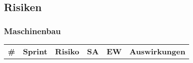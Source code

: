 \documentclass[main.tex]{subfiles} %
\begin{document}
\setcounter{counter}{0}

\subsection{Risiken}

\subsubsection{Maschinenbau}
\begin{table}[H]

    \begin{tabularx}{\textwidth}{|>{\centering\arraybackslash}p{0.5cm}|>{\raggedright\arraybackslash}p{1.5cm}|>{\raggedright\arraybackslash}X|>{\centering\arraybackslash}p{0.75cm}|>{\centering\arraybackslash}p{0.75cm}|>{\raggedright\arraybackslash}X|}
        \hline
        \textbf{\#}                                 & \textbf{Sprint} & \textbf{Risiko}                                                         & \textbf{SA} & \textbf{EW} & \textbf{Auswirkungen} \\


\end{tabularx}
\end{table}
\end{document}
